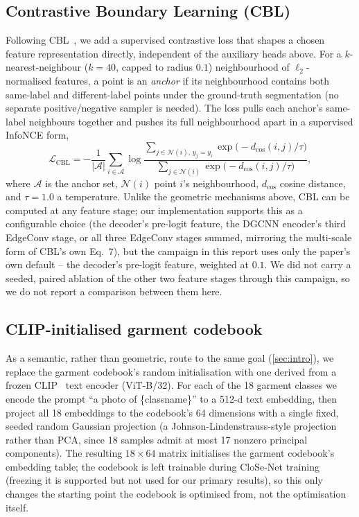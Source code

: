 \documentclass{article}
\theoremstyle{plain}
\theoremstyle{definition}
\theoremstyle{remark}
\begin{document}
\subsection{Contrastive Boundary Learning (CBL)}
\label{sec:methodology:cbl}

Following CBL~\cite{tang2022contrastive}, we add a supervised contrastive loss
that shapes a chosen feature representation directly, independent of the
auxiliary heads above. For a $k$-nearest-neighbour ($k{=}40$, capped to
radius $0.1$) neighbourhood of $\ell_2$-normalised features, a point is an
\emph{anchor} if its neighbourhood contains both same-label and
different-label points under the ground-truth segmentation (no separate
positive/negative sampler is needed). The loss pulls each anchor's
same-label neighbours together and pushes its full neighbourhood apart in a
supervised InfoNCE form,
\begin{equation}
  \mathcal{L}_{\text{CBL}} = -\frac{1}{|\mathcal{A}|}\sum_{i\in\mathcal{A}}
  \log \frac{\sum_{j \in \mathcal{N}(i),\, y_j = y_i} \exp\!\big(-d_{\cos}(i,j)/\tau\big)}
             {\sum_{j \in \mathcal{N}(i)} \exp\!\big(-d_{\cos}(i,j)/\tau\big)},
  \label{eq:cbl-loss}
\end{equation}
where $\mathcal{A}$ is the anchor set, $\mathcal{N}(i)$ point $i$'s
neighbourhood, $d_{\cos}$ cosine distance, and $\tau{=}1.0$ a temperature.
Unlike the geometric mechanisms above, CBL can be computed at any feature
stage; our implementation supports this as a configurable choice (the
decoder's pre-logit feature, the DGCNN encoder's third EdgeConv stage, or all
three EdgeConv stages summed, mirroring the multi-scale form of CBL's own
Eq.~7), but the campaign in this report uses only the paper's own default --
the decoder's pre-logit feature, weighted at $0.1$. We did not carry a
seeded, paired ablation of the other two feature stages through this
campaign, so we do not report a comparison between them here.

\subsection{CLIP-initialised garment codebook}
\label{sec:methodology:clip}

As a semantic, rather than geometric, route to the same goal
(\cref{sec:intro}), we replace the garment codebook's random initialisation
with one derived from a frozen CLIP~\cite{radford2021clip} text encoder
(ViT-B/32). For each of the 18 garment classes we encode the prompt
``a photo of \{classname\}'' to a 512-d text embedding, then project all 18
embeddings to the codebook's 64 dimensions with a single fixed, seeded random
Gaussian projection (a Johnson-Lindenstrauss-style projection rather than
PCA, since 18 samples admit at most 17 nonzero principal components). The
resulting $18\times64$ matrix initialises the garment codebook's embedding
table; the codebook is left trainable during CloSe-Net training (freezing it
is supported but not used for our primary results), so this only changes the
starting point the codebook is optimised from, not the optimisation itself.
\end{document}
